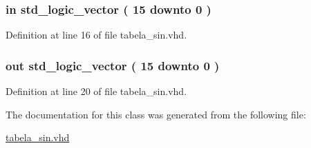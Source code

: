 \subsubsection[{theta}]{ {\bfseries \textcolor{keywordflow}{in}\textcolor{vhdlchar}{ }} {\bfseries \textcolor{comment}{std\+\_\+logic\+\_\+vector}\textcolor{vhdlchar}{ }\textcolor{vhdlchar}{(}\textcolor{vhdlchar}{ }\textcolor{vhdlchar}{ } \textcolor{vhdldigit}{15} \textcolor{vhdlchar}{ }\textcolor{keywordflow}{downto}\textcolor{vhdlchar}{ }\textcolor{vhdlchar}{ } \textcolor{vhdldigit}{0} \textcolor{vhdlchar}{ }\textcolor{vhdlchar}{)}\textcolor{vhdlchar}{ }} \hspace{0.3cm}{\ttfamily [Port]}}\label{classtabela__sin_afad6cf0a3cf35dff4473dba942ec361a}


Definition at line 16 of file tabela\+\_\+sin.\+vhd.

\hypertarget{classtabela__sin_a2c2cf4dbd0533e281ac8b2f114f11e67}{}
\subsubsection[{va}]{ {\bfseries \textcolor{keywordflow}{out}\textcolor{vhdlchar}{ }} {\bfseries \textcolor{comment}{std\+\_\+logic\+\_\+vector}\textcolor{vhdlchar}{ }\textcolor{vhdlchar}{(}\textcolor{vhdlchar}{ }\textcolor{vhdlchar}{ } \textcolor{vhdldigit}{15} \textcolor{vhdlchar}{ }\textcolor{keywordflow}{downto}\textcolor{vhdlchar}{ }\textcolor{vhdlchar}{ } \textcolor{vhdldigit}{0} \textcolor{vhdlchar}{ }\textcolor{vhdlchar}{)}\textcolor{vhdlchar}{ }} \hspace{0.3cm}{\ttfamily [Port]}}\label{classtabela__sin_a2c2cf4dbd0533e281ac8b2f114f11e67}


Definition at line 20 of file tabela\+\_\+sin.\+vhd.



The documentation for this class was generated from the following file\+:\begin{DoxyCompactItemize}
\item 
\hyperlink{tabela__sin_8vhd}{tabela\+\_\+sin.\+vhd}\end{DoxyCompactItemize}
